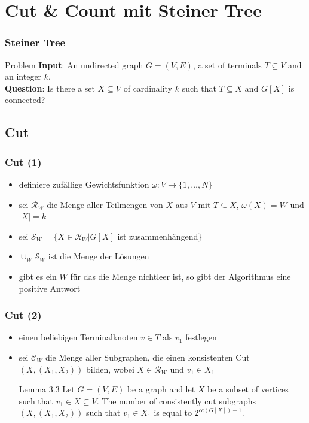 \documentclass{beamer}
\begin{document}
\section{Cut \& Count mit Steiner Tree} %
\begin{frame}
\frametitle{Steiner Tree}
\begin{block}{Problem}
\textbf{Input}: An undirected graph $G = (V, E)$, a set of terminals $T \subseteq V$ and an integer $k$. \\
\textbf{Question}: Is there a set $X \subseteq V$ of cardinality $k$ such that $T \subseteq X$ and $G[X]$ is connected?
\end{block}
\end{frame}
\subsection{Cut}
\begin{frame}
\frametitle{Cut (1)}
\begin{itemize}
\pause
\item definiere zufällige Gewichtsfunktion $\omega:V\rightarrow \{1,\dots,N\}$ 
\pause
\item sei $\mathcal{R}_W$ die Menge aller Teilmengen von $X$ aus $V$ mit $T \subseteq X$, $\omega(X)=W$ und $|X|=k$
\pause
\item sei  $\mathcal{S}_W=\{X \in \mathcal{R}_W | G[X]$ ist zusammenhängend$\}$ 
\pause
\item $\cup_W \mathcal{S}_W$ ist die Menge der Lösungen
\pause
\item gibt es ein $W$ für das die Menge nichtleer ist, so gibt der Algorithmus eine positive Antwort
\end{itemize}
\end{frame}
\begin{frame}
\frametitle{Cut (2)}
\begin{itemize}
\pause
\item einen beliebigen Terminalknoten $v \in T$ als $v_1$ festlegen
\pause
\item sei $\mathcal{C}_W$ die Menge aller Subgraphen, die einen konsistenten Cut $(X,(X_1,X_2))$ bilden, wobei $X\in \mathcal{R}_W$ und $v_1 \in X_1$ 
\newline
\newline
\pause
\begin{block}{Lemma 3.3}
Let $G=(V,E)$ be a graph and let $X$ be a subset of vertices such that $v_1 \in X \subseteq V$. The number of
consistently cut subgraphs $(X,(X_1,X_2))$ such that $v_1 \in X_1$ is equal to $2^{cc(G[X])-1}$.
\end{block}
\end{itemize}
\end{frame}
\end{document}
